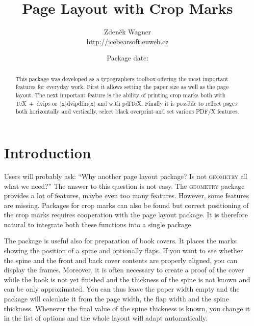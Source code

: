 \documentclass[11pt]{article}
\let\pkg\textsc
\begin{document}

\title{Page Layout with Crop Marks}
\author{Zdeněk Wagner\\\url{http://icebearsoft.euweb.cz}}
\date{Package date: }
\maketitle

\begin{abstract}\noindent
This package was developed as a typographers toolbox offering the most important features for
everyday work. First it allows setting the paper size as well as the page layout. The next
important feature is the ability of printing crop marks both with \TeX~+~dvips or (x)dvipdfm(x) and with pdf\TeX.
Finally it is possible to reflect pages both horizontally and vertically, select black overprint
and set various PDF/X features.
\end{abstract}

\tableofcontents

\section{Introduction}
Users will probably ask: ``Why another page layout package? Is not \pkg{geometry} all what we
need?'' The answer to this question is not easy. The \pkg{geometry} package provides a lot of
features, maybe even too many features. However, some features are missing. Packages for crop marks
can also be found but correct positioning of the crop marks requires cooperation with the
page layout package. It is therefore natural to integrate both these functions into a single
package.

The package is useful also for preparation of book covers. It places the marks showing the position
of a spine and optionally flaps. If you want to see whether the spine and the front and back cover
contents are properly aligned, you can display the frames. Moreover, it is often necessary to
create a proof of the cover while the book is not yet finished and the thickness of the spine is
not known and can be only approximated. You can thus leave the paper width empty and the package
will calculate it from the page width, the flap width and the spine thickness. Whenever the final
value of the spine thickness is known, you change it in the list of options and the whole layout
will adapt automatically.
\end{document}
